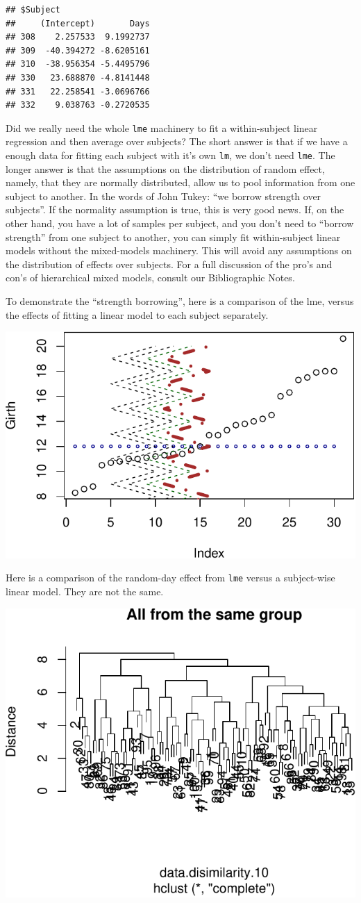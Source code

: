 \documentclass[]{book}
\theoremstyle{definition}
\theoremstyle{definition}
\theoremstyle{definition}
\theoremstyle{remark}
\begin{document}
\begin{verbatim}
## $Subject
##     (Intercept)       Days
## 308    2.257533  9.1992737
## 309  -40.394272 -8.6205161
## 310  -38.956354 -5.4495796
## 330   23.688870 -4.8141448
## 331   22.258541 -3.0696766
## 332    9.038763 -0.2720535
\end{verbatim}

Did we really need the whole \texttt{lme} machinery to fit a within-subject linear regression and then average over subjects?
The short answer is that if we have a enough data for fitting each subject with it's own \texttt{lm}, we don't need \texttt{lme}.
The longer answer is that the assumptions on the distribution of random effect, namely, that they are normally distributed, allow us to pool information from one subject to another.
In the words of John Tukey: ``we borrow strength over subjects''.
If the normality assumption is true, this is very good news.
If, on the other hand, you have a lot of samples per subject, and you don't need to ``borrow strength'' from one subject to another, you can simply fit within-subject linear models without the mixed-models machinery.
This will avoid any assumptions on the distribution of effects over subjects.
For a full discussion of the pro's and con's of hierarchical mixed models, consult our Bibliographic Notes.

To demonstrate the ``strength borrowing'', here is a comparison of the lme, versus the effects of fitting a linear model to each subject separately.

\includegraphics[width=0.5\linewidth]{Rcourse_files/figure-latex/unnamed-chunk-203-1}

Here is a comparison of the random-day effect from \texttt{lme} versus a subject-wise linear model. They are not the same.

\includegraphics[width=0.5\linewidth]{Rcourse_files/figure-latex/unnamed-chunk-204-1}
\end{document}
